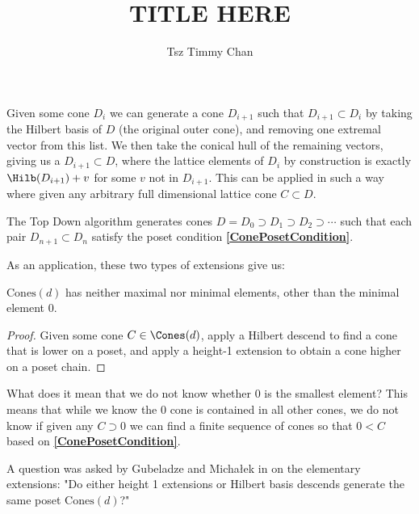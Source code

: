 \documentclass{TC}
\title{TITLE HERE}	%
\author{Tsz Timmy Chan}	%
\begin{document}
Given some cone $D_i$ we can generate a cone $D_{i+1}$ such that $D_{i+1} \subset D_i$ by taking the Hilbert basis of $D$ (the original outer cone), and removing one extremal vector from this list. We then take the conical hull of the remaining vectors, giving us a $D_{i+1} \subset D$, where the lattice elements of $D_{i}$ by construction is exactly $\Hilb(D_{i+1}) + v$ for some $v$ not in $D_{i+1}$. This can be applied in such a way where given any arbitrary full dimensional lattice cone $C \subset D$.

\begin{lemma} \label{topdownposetlemma}
The Top Down algorithm generates cones $D = D_0 \supset D_1 \supset D_2 \supset \cdots$ such that each pair $D_{n+1} \subset D_{n}$ satisfy the poset condition \textbf{\ref{ConePosetCondition}}. 
\end{lemma}

As an application, these two types of extensions give us:

\begin{lemma}
$\mathrm{Cones}(d)$ has neither maximal nor minimal elements, other than the minimal element 0.
\end{lemma}
\begin{proof}
Given some cone $C \in \Cones(d)$, apply a Hilbert descend to find a cone that is lower on a poset, and apply a height-1 extension to obtain a cone higher on a poset chain.
\end{proof}

What does it mean that we do not know whether 0 is the smallest element? This means that while we know the 0 cone is contained in all other cones, we do not know if given any $C \supset 0$ we can find a finite sequence of cones so that $0 < C$ based on \textbf{\ref{ConePosetCondition}}.

A question was asked by Gubeladze and Micha\l{}ek in \cite{GubeladzePosetCones} on the elementary extensions: "Do either height 1 extensions or Hilbert basis descends generate the same poset $\mathrm{Cones}(d)$?" 
\end{document}
